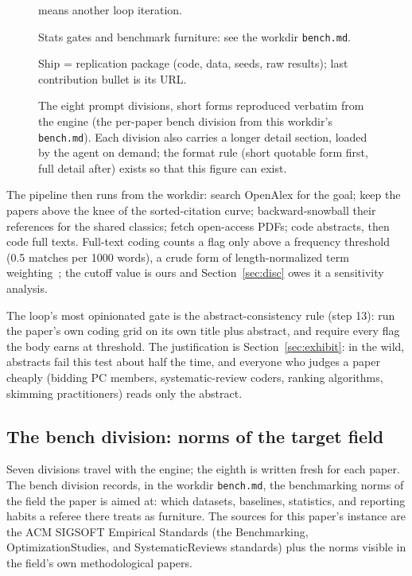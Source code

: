 \begin{figure}[t]
\begin{minipage}[t]{0.48\textwidth}
{means another loop iteration.
\item Stats gates and benchmark furniture: see the workdir
\texttt{bench.md}.
\item Ship = replication package (code, data, seeds, raw results);
last contribution bullet is its URL.}
\end{minipage}
\caption{The eight prompt divisions, short forms reproduced verbatim
from the engine (the per-paper bench division from this workdir's
\texttt{bench.md}).
Each division also carries a longer detail section, loaded by the
agent on demand; the format rule (short quotable form first, full
detail after) exists so that this figure can exist.}
\label{fig:prompts}
\end{figure}

The pipeline then runs from the workdir: search OpenAlex for the goal;
keep the papers above the knee of the sorted-citation curve;
backward-snowball their references for the shared classics; fetch
open-access PDFs; code abstracts, then code full texts.
Full-text coding counts a flag only above a frequency threshold (0.5
matches per 1000 words), a crude form of length-normalized term
weighting~\cite{salton88}; the cutoff value is ours and
Section~\ref{sec:disc} owes it a sensitivity analysis.

The loop's most opinionated gate is the abstract-consistency rule
(step 13): run the paper's own coding grid on its own title plus
abstract, and require every flag the body earns at threshold.
The justification is Section~\ref{sec:exhibit}: in the wild, abstracts
fail this test about half the time, and everyone who judges a paper
cheaply (bidding PC members, systematic-review coders, ranking
algorithms, skimming practitioners) reads only the abstract.

\subsection{The bench division: norms of the target field}
\label{sec:bench}

Seven divisions travel with the engine; the eighth is written fresh
for each paper.
The bench division records, in the workdir \texttt{bench.md}, the
benchmarking norms of the field the paper is aimed at: which datasets,
baselines, statistics, and reporting habits a referee there treats as
furniture.
The sources for this paper's instance are the ACM SIGSOFT Empirical
Standards (the Benchmarking, OptimizationStudies, and
SystematicReviews standards) plus the norms visible in the field's own
methodological papers.

